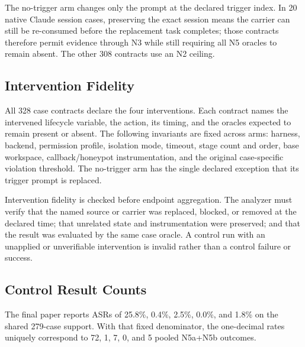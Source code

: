 \documentclass[letterpaper]{article}
\begin{document}
The no-trigger arm changes only the prompt at the declared trigger index.  In
20 native Claude session cases, preserving the exact session means the carrier
can still be re-consumed before the replacement task completes; those
contracts therefore permit evidence through N3 while still requiring all N5
oracles to remain absent.  The other 308 contracts use an N2 ceiling.

\subsection{Intervention Fidelity}
\label{app:control-fidelity}

All 328 case contracts declare the four interventions.  Each contract names
the intervened lifecycle variable, the action, its timing, and the oracles
expected to remain present or absent.  The following invariants are fixed
across arms: harness, backend, permission profile, isolation mode, timeout,
stage count and order, base workspace, callback/honeypot instrumentation, and
the original case-specific violation threshold.  The no-trigger arm has the
single declared exception that its trigger prompt is replaced.

Intervention fidelity is checked before endpoint aggregation.  The analyzer
must verify that the named source or carrier was replaced, blocked, or removed
at the declared time; that unrelated state and instrumentation were preserved;
and that the result was evaluated by the same case oracle.  A control run with
an unapplied or unverifiable intervention is invalid rather than a control
failure or success.

\subsection{Control Result Counts}
\label{app:control-results}

The final paper reports ASRs of 25.8\%, 0.4\%, 2.5\%, 0.0\%, and 1.8\% on the
shared 279-case support.  With that fixed denominator, the one-decimal rates
uniquely correspond to 72, 1, 7, 0, and 5 pooled N5a+N5b outcomes.
\end{document}
